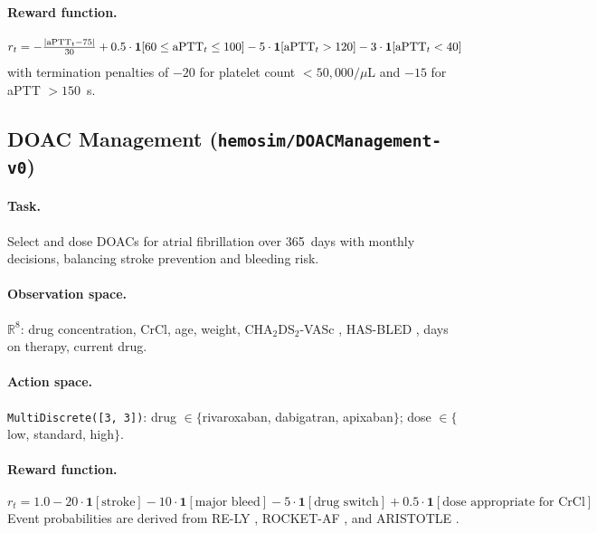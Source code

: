 \documentclass[11pt]{article}
\begin{document}
\paragraph{Reward function.}
\begin{equation}
  r_t = -\tfrac{|{\rm aPTT}_t - 75|}{30} + 0.5 \cdot \mathbf{1}[60 \leq {\rm aPTT}_t \leq 100] - 5 \cdot \mathbf{1}[{\rm aPTT}_t > 120] - 3 \cdot \mathbf{1}[{\rm aPTT}_t < 40]
  \label{eq:heparin_reward}
\end{equation}
with termination penalties of $-20$ for platelet count $< 50{,}000/\mu$L and $-15$ for aPTT $> 150$~s.

\subsection{DOAC Management (\texttt{hemosim/DOACManagement-v0})}

\paragraph{Task.} Select and dose DOACs for atrial fibrillation over 365~days with monthly decisions, balancing stroke prevention and bleeding risk.

\paragraph{Observation space.} $\mathbb{R}^{8}$: drug concentration, CrCl, age, weight, CHA$_2$DS$_2$-VASc \citep{lip2010}, HAS-BLED \citep{pisters2010}, days on therapy, current drug.

\paragraph{Action space.} \texttt{MultiDiscrete([3, 3])}: drug $\in \{$rivaroxaban, dabigatran, apixaban$\}$; dose $\in \{$low, standard, high$\}$.

\paragraph{Reward function.}
\begin{equation}
  r_t = 1.0 - 20 \cdot \mathbf{1}[\text{stroke}] - 10 \cdot \mathbf{1}[\text{major bleed}] - 5 \cdot \mathbf{1}[\text{drug switch}] + 0.5 \cdot \mathbf{1}[\text{dose appropriate for CrCl}]
  \label{eq:doac_reward}
\end{equation}
Event probabilities are derived from RE-LY \citep{connolly2009}, ROCKET-AF \citep{patel2011}, and ARISTOTLE \citep{granger2011}.
\end{document}
